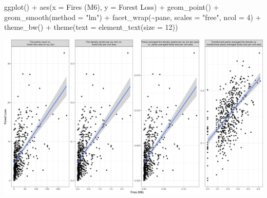 \documentclass[10pt,landscape,a3paper]{article}
\newenvironment{Shaded}{\begin{snugshade}}{\end{snugshade}}
\newcommand{\AttributeTok}[1]{\textcolor[rgb]{0.77,0.63,0.00}{#1}}
\newcommand{\DecValTok}[1]{\textcolor[rgb]{0.00,0.00,0.81}{#1}}
\newcommand{\FunctionTok}[1]{\textcolor[rgb]{0.00,0.00,0.00}{#1}}
\newcommand{\NormalTok}[1]{#1}
\newcommand{\SpecialCharTok}[1]{\textcolor[rgb]{0.00,0.00,0.00}{#1}}
\newcommand{\StringTok}[1]{\textcolor[rgb]{0.31,0.60,0.02}{#1}}
\begin{document}
\begin{Shaded}
\begin{Highlighting}[]
    \FunctionTok{ggplot}\NormalTok{() }\SpecialCharTok{+} \FunctionTok{aes}\NormalTok{(}\AttributeTok{x =} \StringTok{\textasciigrave{}}\AttributeTok{Fires (M6)}\StringTok{\textasciigrave{}}\NormalTok{, }\AttributeTok{y =} \StringTok{\textasciigrave{}}\AttributeTok{Forest Loss}\StringTok{\textasciigrave{}}\NormalTok{) }\SpecialCharTok{+} \FunctionTok{geom\_point}\NormalTok{() }\SpecialCharTok{+} \FunctionTok{geom\_smooth}\NormalTok{(}\AttributeTok{method =} \StringTok{"lm"}\NormalTok{) }\SpecialCharTok{+}
    \FunctionTok{facet\_wrap}\NormalTok{(}\SpecialCharTok{\textasciitilde{}}\NormalTok{pane, }\AttributeTok{scales =} \StringTok{"free"}\NormalTok{, }\AttributeTok{ncol =} \DecValTok{4}\NormalTok{) }\SpecialCharTok{+} \FunctionTok{theme\_bw}\NormalTok{() }\SpecialCharTok{+} \FunctionTok{theme}\NormalTok{(}\AttributeTok{text =} \FunctionTok{element\_text}\NormalTok{(}\AttributeTok{size =} \DecValTok{12}\NormalTok{))}
\end{Highlighting}
\end{Shaded}

\begin{center}\includegraphics{img/modelling/lta-esda-14} \end{center}
\end{document}
